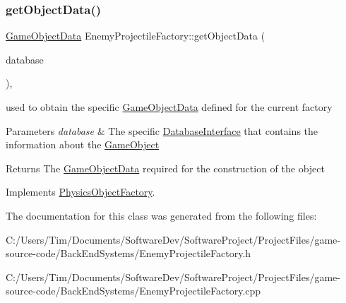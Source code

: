 \subsubsection{\texorpdfstring{get\+Object\+Data()}{getObjectData()}}
{\footnotesize\ttfamily \hyperlink{struct_game_object_data}{Game\+Object\+Data} Enemy\+Projectile\+Factory\+::get\+Object\+Data (\begin{DoxyParamCaption}\item[{const std\+::shared\+\_\+ptr$<$ \hyperlink{class_database_interface}{Database\+Interface} $>$ \&}]{database }\end{DoxyParamCaption})\hspace{0.3cm}{\ttfamily [override]}, {\ttfamily [virtual]}}



used to obtain the specific \hyperlink{struct_game_object_data}{Game\+Object\+Data} defined for the current factory 


\begin{DoxyParams}{Parameters}
{\em database} & The specific \hyperlink{class_database_interface}{Database\+Interface} that contains the information about the \hyperlink{class_game_object}{Game\+Object} \\
\hline
\end{DoxyParams}
\begin{DoxyReturn}{Returns}
The \hyperlink{struct_game_object_data}{Game\+Object\+Data} required for the construction of the object 
\end{DoxyReturn}


Implements \hyperlink{class_physics_object_factory_aa59f52d3adc1fac676f4a8a3c2de9ba9}{Physics\+Object\+Factory}.



The documentation for this class was generated from the following files\+:\begin{DoxyCompactItemize}
\item 
C\+:/\+Users/\+Tim/\+Documents/\+Software\+Dev/\+Software\+Project/\+Project\+Files/game-\/source-\/code/\+Back\+End\+Systems/Enemy\+Projectile\+Factory.\+h\item 
C\+:/\+Users/\+Tim/\+Documents/\+Software\+Dev/\+Software\+Project/\+Project\+Files/game-\/source-\/code/\+Back\+End\+Systems/Enemy\+Projectile\+Factory.\+cpp\end{DoxyCompactItemize}

